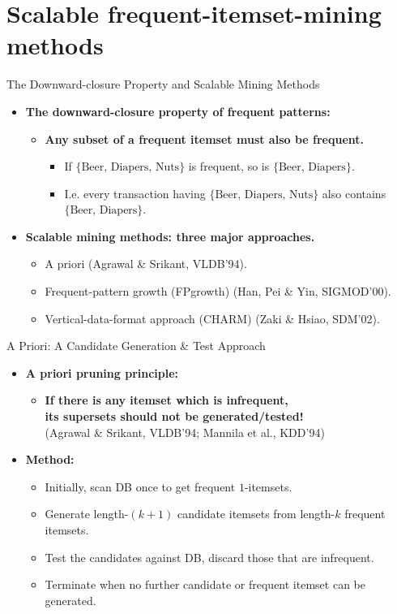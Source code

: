 \section{Scalable frequent-itemset-mining methods}

\begin{frame}{The Downward-closure Property and Scalable Mining Methods}
	\begin{itemize}
		\item \textbf{The downward-closure property of frequent patterns:}
		\begin{itemize}
			\item \textbf{\color{airforceblue}Any subset of a frequent itemset 
			must also be frequent.}
			\begin{itemize}
				\item If $\{\text{Beer, Diapers, Nuts}\}$ is frequent, so is 
				$\{\text{Beer, Diapers}\}$.
				\item I.e. every transaction having $\{\text{Beer, Diapers, 
				Nuts}\}$ also contains $\{\text{Beer, Diapers}\}$.
			\end{itemize}
		\end{itemize}
		\item \textbf{Scalable mining methods: three major approaches.}
		\begin{itemize}
			\item A priori (Agrawal \& Srikant, VLDB'94).
			\item Frequent-pattern growth (FPgrowth) (Han, Pei \& Yin, 
			SIGMOD'00).
			\item Vertical-data-format approach (CHARM) (Zaki \& Hsiao, SDM'02).
		\end{itemize}
	\end{itemize}
\end{frame}

\begin{frame}{A Priori: A Candidate Generation \& Test Approach}
	\begin{itemize}
		\item \textbf{A priori pruning principle:}
		\begin{itemize}
			\item \textbf{\color{airforceblue}If there is any itemset which is 
			infrequent, \\ its supersets should not be generated/tested!} \\ 
			(Agrawal \& Srikant, VLDB'94; Mannila et al., KDD'94)
		\end{itemize}
		\item \textbf{Method:}
		\begin{itemize}
			\item Initially, scan DB once to get frequent $1$-itemsets.
			\item Generate length-$(k+1)$ candidate itemsets from length-$k$ 
			frequent itemsets.
			\item Test the candidates against DB, discard those that are 
			infrequent.
			\item Terminate when no further candidate or frequent itemset can 
			be generated.
		\end{itemize}
	\end{itemize}
\end{frame}

